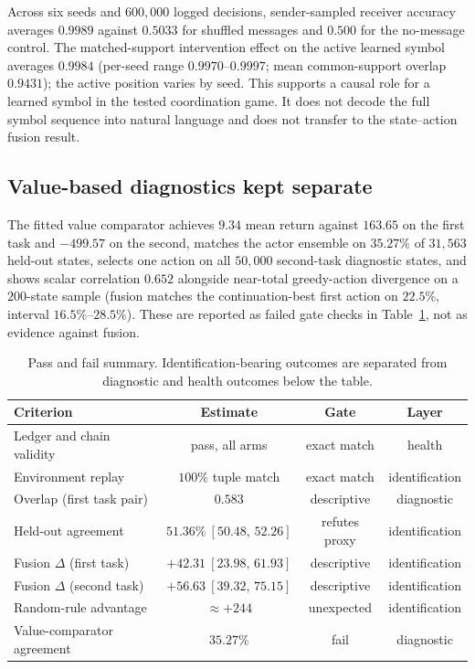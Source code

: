 \documentclass[11pt,a4paper]{article}
\theoremstyle{definition}
\begin{document}
Across six seeds and $600{,}000$ logged decisions, sender-sampled receiver
accuracy averages $0.9989$ against $0.5033$ for shuffled messages and $0.500$
for the no-message control. The matched-support intervention effect on the
active learned symbol averages $0.9984$ (per-seed range $0.9970$--$0.9997$;
mean common-support overlap $0.9431$); the active position varies by seed.
This supports a causal role for a learned symbol in the tested coordination
game. It does not decode the full symbol sequence into natural language and
does not transfer to the state--action fusion result.

\subsection{Value-based diagnostics kept separate}

The fitted value comparator achieves $9.34$ mean return against $163.65$ on
the first task and $-499.57$ on the second, matches the actor ensemble on
$35.27\%$ of $31{,}563$ held-out states, selects one action on all $50{,}000$
second-task diagnostic states, and shows scalar correlation $0.652$
alongside near-total greedy-action divergence on a $200$-state sample (fusion
matches the continuation-best first action on $22.5\%$, interval
$16.5\%$--$28.5\%$). These are reported as failed gate checks in
Table~\ref{tab:gates}, not as evidence against fusion.

\begin{table}[t]
\centering
\caption{Pass and fail summary. Identification-bearing outcomes are
separated from diagnostic and health outcomes below the table.}
\label{tab:gates}
{\footnotesize
\begin{tabular}{lccc}
\toprule
Criterion & Estimate & Gate & Layer \\
\midrule
Ledger and chain validity & pass, all arms & exact match & health \\
Environment replay & $100\%$ tuple match & exact match & identification \\
Overlap (first task pair) & $0.583$ & descriptive & diagnostic \\
Held-out agreement & $51.36\%\ [50.48,\,52.26]$ & refutes proxy & identification \\
Fusion $\Delta$ (first task) & $+42.31\ [23.98,\,61.93]$ & descriptive & identification \\
Fusion $\Delta$ (second task) & $+56.63\ [39.32,\,75.15]$ & descriptive & identification \\
Random-rule advantage & $\approx +244$ & unexpected & identification \\
Value-comparator agreement & $35.27\%$ & fail & diagnostic \\
\bottomrule
\end{tabular}
}
\end{table}
\end{document}

